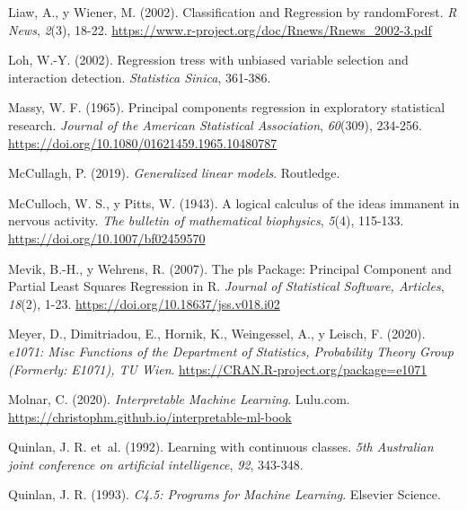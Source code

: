 \documentclass[
]{book}
\newlength{\cslhangindent}
\newlength{\cslentryspacingunit} %
\newenvironment{CSLReferences}[2] %
 {%
  \setlength{\parindent}{0pt}
  \ifodd #1
  \let\oldpar\par
  \def\par{\hangindent=\cslhangindent\oldpar}
  \fi
  \setlength{\parskip}{#2\cslentryspacingunit}
 }%
 {}
\theoremstyle{break}
\theoremstyle{nonumberplain}
\begin{document}
\begin{CSLReferences}{1}{0}
\leavevmode{}%
Liaw, A., y Wiener, M. (2002). Classification and Regression by {randomForest}. \emph{R News}, \emph{2}(3), 18-22. \url{https://www.r-project.org/doc/Rnews/Rnews_2002-3.pdf}

\leavevmode{}%
Loh, W.-Y. (2002). Regression tress with unbiased variable selection and interaction detection. \emph{Statistica Sinica}, 361-386.

\leavevmode{}%
Massy, W. F. (1965). Principal components regression in exploratory statistical research. \emph{Journal of the American Statistical Association}, \emph{60}(309), 234-256. \url{https://doi.org/10.1080/01621459.1965.10480787}

\leavevmode{}%
McCullagh, P. (2019). \emph{Generalized linear models}. Routledge.

\leavevmode{}%
McCulloch, W. S., y Pitts, W. (1943). A logical calculus of the ideas immanent in nervous activity. \emph{The bulletin of mathematical biophysics}, \emph{5}(4), 115-133. \url{https://doi.org/10.1007/bf02459570}

\leavevmode{}%
Mevik, B.-H., y Wehrens, R. (2007). The pls Package: Principal Component and Partial Least Squares Regression in R. \emph{Journal of Statistical Software, Articles}, \emph{18}(2), 1-23. \url{https://doi.org/10.18637/jss.v018.i02}

\leavevmode{}%
Meyer, D., Dimitriadou, E., Hornik, K., Weingessel, A., y Leisch, F. (2020). \emph{e1071: Misc Functions of the Department of Statistics, Probability Theory Group (Formerly: E1071), TU Wien}. \url{https://CRAN.R-project.org/package=e1071}

\leavevmode{}%
Molnar, C. (2020). \emph{Interpretable Machine Learning}. Lulu.com. \url{https://christophm.github.io/interpretable-ml-book}

\leavevmode{}%
Quinlan, J. R. et~al. (1992). Learning with continuous classes. \emph{5th Australian joint conference on artificial intelligence}, \emph{92}, 343-348.

\leavevmode{}%
Quinlan, J. R. (1993). \emph{C4.5: Programs for Machine Learning}. Elsevier Science.


\end{CSLReferences}
\end{document}
